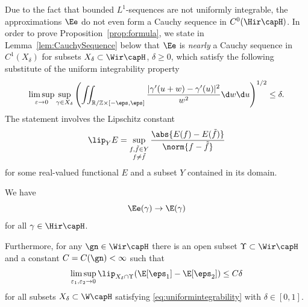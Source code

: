 Due to the fact that bounded $L^1$-sequences are not uniformly integrable, the approximations $\Ee$ do not even form
a Cauchy sequence in $C^0(\Hir\capH)$.
In order to prove Proposition~\ref{prop:formula}, we state in Lemma~\ref{lem:CauchySequence} below
that $\Ee$ is \emph{nearly} a Cauchy sequence 
in $C^1(X_{\delta})$ for subsets $X_\delta \subset \Wir\capH$, $\delta\ge0$,
which satisfy the following substitute of the uniform integrability property
\begin{equation}\label{eq:uniformintegrability}
 \limsup_{\varepsilon \rightarrow 0}\sup_{\gamma \in X_\delta} 
  \left(\iint_{\mathbb R / \mathbb Z \times [-\eps, \eps]}
  \frac {|\gamma'(u+w) - \gamma'(u)|^2}{w^2} \d w \d u \right) ^{1/2}
\leq \delta.
\end{equation}
The statement involves the Lipschitz constant
\[ \lip_Y E = \sup_{\substack{f,\tilde f\in Y\\f\ne\tilde f}}\frac{\abs{E(f)-E(\tilde f)}}{\norm{f-\tilde f}} \]
for some real-valued functional $E$ and a subset $Y$ contained in its domain.

\begin{lemma} \label{lem:CauchySequence}
 We have
 \begin{equation*}
  \Ee(\gamma) \rightarrow \E(\gamma)
 \end{equation*}
 for all $\gamma \in \Hir \capH$.

 Furthermore, for any $\gn \in \Wir\capH$ there is an open subset $\Upsilon \subset \Wir\capH$ 
 and a constant $C=C(\gn) < \infty$ such that
\begin{equation}
 \limsup_{\varepsilon_1, \varepsilon_2 \rightarrow 0}\lip_{X_\delta\cap\Upsilon} (\E[\eps_1] - \E[\eps_2])
 \le C \delta\label{eq:CauchySequence2}
\end{equation}
for all subsets $X_\delta \subset \W\capH$ satisfying \eqref{eq:uniformintegrability} with $\delta \in[0,1]$.
\end{lemma}

